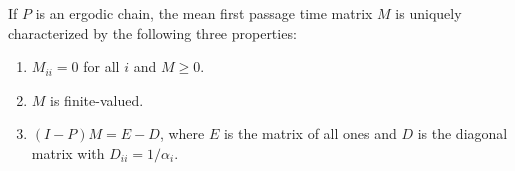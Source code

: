 If $P$ is an ergodic chain, the mean first passage time matrix $M$ is uniquely characterized by the following three properties:
\begin{enumerate}
\item[(1)] $M_{ii} = 0$ for all $i$ and $M \geq 0$.
\item[(2)] $M$ is finite-valued.
\item[(3)] $(I - P)M = E - D$, where $E$ is the matrix of all ones and $D$ is the diagonal matrix with $D_{ii} = 1/\alpha_i$.
\end{enumerate}
